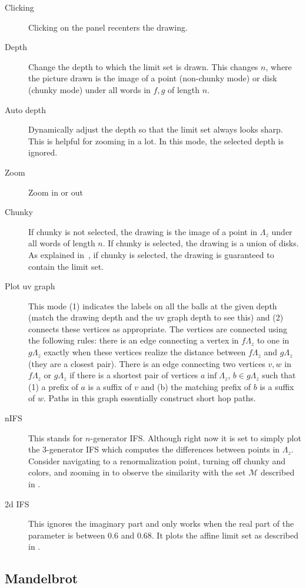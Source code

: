 \documentclass{amsart}
\begin{document}
\begin{description}
\item[Clicking] Clicking on the panel recenters the drawing.
\item[Depth] Change the depth to which the limit set is drawn.  This changes $n$, 
where the picture drawn is the image of a point (non-chunky mode) or 
disk (chunky mode) under all words in $f,g$ of length $n$.
\item[Auto depth] Dynamically adjust the depth so that 
the limit set always looks sharp.  This is helpful for zooming in a lot. 
In this mode, the selected 
depth is ignored.
\item[Zoom] Zoom in or out
\item[Chunky]  If chunky is not selected, the drawing is the image 
of a point in $\Lambda_z$ under all words of length $n$.  If chunky is 
selected, the drawing is a union of disks.  As explained in~\cite{paper}, 
if chunky is selected, the drawing is guaranteed to contain the limit set.
\item[Plot uv graph] This mode (1) indicates the labels on all 
the balls at the given depth (match the drawing depth and the uv graph 
depth to see this) and (2) connects these vertices as appropriate.  
The vertices are connected using the following rules: there is an 
edge connecting a vertex in $f\Lambda_z$ to one in $g\Lambda_z$ 
exactly when these vertices realize the distance between $f\Lambda_z$ and $g\Lambda_z$ 
(they are a closest pair).  
There is an edge connecting two vertices $v,w$ in $f\Lambda_z$ or 
$g\Lambda_z$ if there is a shortest pair of vertices $a\inf\Lambda_z$, $b\in g\Lambda_z$
such that (1) a prefix of $a$ is a suffix of $v$ and (b) the matching prefix of 
$b$ is a suffix of $w$.  Paths in this graph essentially construct short hop paths.
\item[nIFS] This stands for $n$-generator IFS.  Although right now it is set to 
simply plot the 3-generator IFS which computes the differences between points in 
$\Lambda_z$.  Consider navigating to a renormalization point, turning off chunky and 
colors, 
and zooming in to observe the similarity with the set $\mathcal{M}$ described in \cite{paper}.
\item[2d IFS]  This ignores the imaginary part and only works when the real part of the 
parameter is between $0.6$ and $0.68$.  It plots the affine limit set as 
described in \cite{paper}.
\end{description}

\subsection{Mandelbrot}
\end{document}
